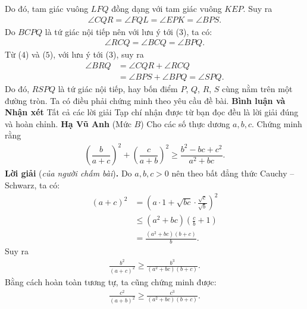 \begin{multicols}{2}
	Do đó, tam giác vuông $LFQ$ đồng dạng với tam giác vuông $KEP$. Suy ra
	\begin{align*}
		\angle CQR = \angle FQL = \angle EPK = \angle BPS. \tag{$4$}
	\end{align*}
	Do $BCPQ$ là tứ giác nội tiếp nên với lưu ý tới ($3$), ta có:
	\begin{align*}
		\angle RCQ = \angle BCQ = \angle BPQ. \tag{$5$}
	\end{align*}
	Từ ($4$) và ($5$), với lưu ý tới ($3$), suy ra
	\begin{align*}
		\angle BRQ &= \angle CQR + \angle RCQ \\
		&= \angle BPS + \angle BPQ = \angle SPQ.
	\end{align*}
	Do đó, $RSPQ$ là tứ giác nội tiếp, hay bốn điểm $P$, $Q$, $R$, $S$ cùng nằm trên một đường tròn.
	\vskip 0.05cm
	Ta có điều phải chứng minh theo yêu cầu đề bài.
	\vskip 0.05cm
	\textbf{\color{thachthuctoanhoc}Bình luận và Nhận xét}
	\vskip 0.05cm
	Tất cả các lời giải Tạp chí nhận được từ bạn đọc đều là lời giải đúng và hoàn chỉnh.
	\vskip 0.05cm
	\hfill \textbf{\color{thachthuctoanhoc}Hạ Vũ Anh}
	\vskip 0.05cm
	{}
	(Mức $B$) Cho các số thực dương $a,b,c$. Chứng minh rằng
	\begin{align*}
		\left(\dfrac b{a+c}\right)^2+\left(\dfrac{c}{a+b}\right)^2\ge \dfrac{b^2-bc+c^2}{a^2+bc}.
	\end{align*}
	\textbf{\color{thachthuctoanhoc}Lời giải} (\textit{của người chấm bài})\textbf{\color{thachthuctoanhoc}.}
	\vskip 0.05cm
	Do $a, b, c > 0$ nên theo bất đẳng thức Cauchy -- Schwarz, ta có:
	\begin{align*}
		{\left( {a + c} \right)^2} &= {\left( {a \cdot 1 + \sqrt {bc}  \cdot \frac{{\sqrt c }}{{\sqrt b }}} \right)^2} \\
		&\le \left( {{a^2} + bc} \right)\left( {\frac{c}{b} + 1} \right) \\
		&= \frac{{\left( {{a^2} + bc} \right)\left( {b + c} \right)}}{b}.
	\end{align*}
	Suy ra
	\begin{align*}
		\frac{{{b^2}}}{{{{\left( {a + c} \right)}^2}}} \ge \frac{{{b^3}}}{{\left( {{a^2} + bc} \right)\left( {b + c} \right)}}. \tag{$1$}
	\end{align*}
	Bằng cách hoàn toàn tương tự, ta cũng chứng minh được:
	\begin{align*}
		\frac{{{c^2}}}{{{{\left( {a + b} \right)}^2}}} \ge \frac{{{c^3}}}{{\left( {{a^2} + bc} \right)\left( {b + c} \right)}}. \tag{$2$}

\end{align*}
\end{multicols}
